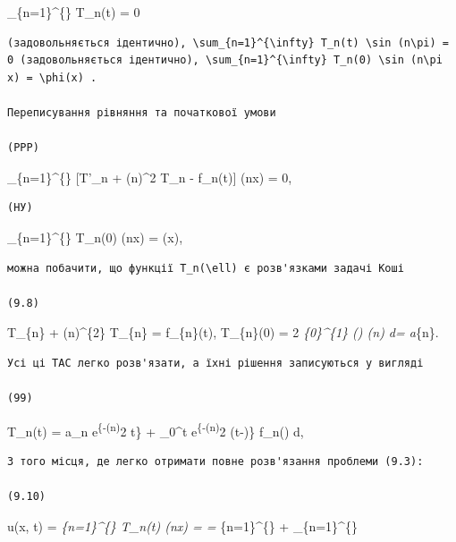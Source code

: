 \documentclass[
  ukrainian,
]{article}
\begin{document}
\sum\_\{n=1\}\^{}\{\infty\} T\_n(t)  = 0

\begin{verbatim}
(задовольняється ідентично), \sum_{n=1}^{\infty} T_n(t) \sin (n\pi) = 0 (задовольняється ідентично), \sum_{n=1}^{\infty} T_n(0) \sin (n\pi x) = \phi(x) .

Переписування рівняння та початкової умови

(PPP)
\end{verbatim}

\sum\_\{n=1\}\^{}\{\infty\} {[}T'\_n + (n\pi\alpha)\^{}2 T\_n -
f\_n(t){]} \sin(n\pi x) = 0,

\begin{verbatim}
(НУ)
\end{verbatim}

\sum\_\{n=1\}\^{}\{\infty\} T\_n(0) \sin(n\pi x) = \varphi(x),

\begin{verbatim}
можна побачити, що функції T_n(\ell) є розв'язками задачі Коші

(9.8)
\end{verbatim}

T\_\{n\} + (n\pi\alpha)\^{}\{2\} T\_\{n\} = f\_\{n\}(t), T\_\{n\}(0) = 2
\int\emph{\{0\}\^{}\{1\} \varphi(\xi) \sin(n\pi\xi) d\xi = a}\{n\}.

\begin{verbatim}
Усі ці TAC легко розв'язати, а їхні рішення записуються у вигляді

(99)
\end{verbatim}

T\_n(t) = a\_n e\textsuperscript{\{-(n\pi\alpha)}2 t\} + \int\_0\^{}t
e\textsuperscript{\{-(n\pi\alpha)}2 (t-\tau)\} f\_n(\tau) d\tau,

\begin{verbatim}
З того місця, де легко отримати повне розв'язання проблеми (9.3):

(9.10)
\end{verbatim}

u(x, t) = \sum\emph{\{n=1\}\^{}\{\infty\} T\_n(t) \sin(n\pi x) = =
\sum}\{n=1\}\^{}\{\infty\}
 +
\sum\_\{n=1\}\^{}\{\infty\}
\end{document}
